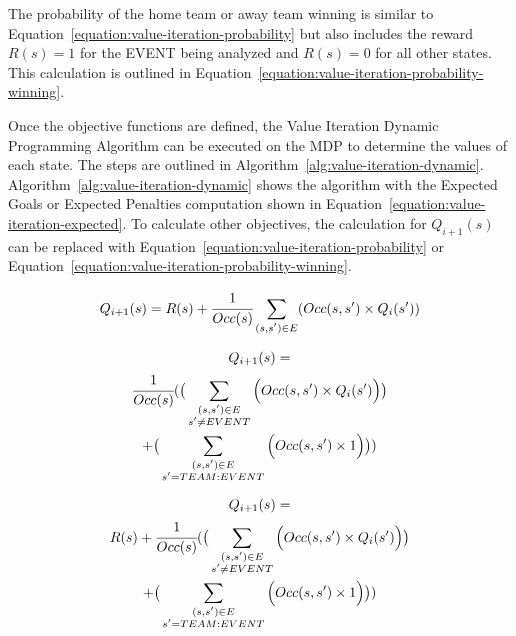 \documentclass[]{article}
\begin{document}
The probability of the home team or away team winning is similar to Equation~\ref{equation:value-iteration-probability} but also includes the reward $R(s)=1$ for the EVENT being analyzed and $R(s)=0$ for all other states. This calculation is outlined in Equation~\ref{equation:value-iteration-probability-winning}.

Once the objective functions are defined, the Value Iteration Dynamic Programming Algorithm can be executed on the MDP to determine the values of each state. The steps are outlined in Algorithm~\ref{alg:value-iteration-dynamic}. Algorithm~\ref{alg:value-iteration-dynamic} shows the algorithm with the Expected Goals or Expected Penalties computation shown in Equation~\ref{equation:value-iteration-expected}. To calculate other objectives, the calculation for $Q_{i+1}(s)$ can be replaced with Equation~\ref{equation:value-iteration-probability} or Equation~\ref{equation:value-iteration-probability-winning}.

\begin{equation}
\label{equation:value-iteration-expected}
Q_{i+1}(s) = R(s) + \cfrac{1}{Occ(s)}\sum_{\substack{(s,s') \in E}}(Occ(s,s')\times Q_{i}(s'))
\end{equation}

\begin{multline}
\label{equation:value-iteration-probability}
Q_{i+1}(s) = \\
\cfrac{1}{Occ(s)}(\big(\sum_{\substack{(s,s') \in E \\ s' \neq EVENT}}\Big(Occ(s,s') \times Q_{i}(s')\Big)\big) \\
+ \big(\sum_{\substack{(s,s') \in E \\ s' = TEAM:EVENT}}\Big(Occ(s,s') \times 1\Big)\big))
\end{multline}

\begin{multline}
\label{equation:value-iteration-probability-winning}
Q_{i+1}(s) = \\
R(s) + \cfrac{1}{Occ(s)}(
\big(\sum_{\substack{(s,s') \in E \\ s' \neq EVENT}}\Big(Occ(s,s')\times Q_{i}(s')\Big)\big) \\
+ \big(\sum_{\substack{(s,s') \in E \\ s' = TEAM:EVENT}}\Big(Occ(s,s') \times 1\Big)\big))
\end{multline}
\end{document}
